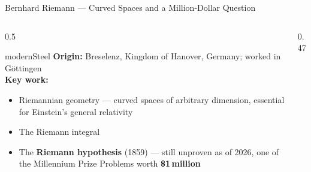 \begin{frame}[shrink=11]{Bernhard Riemann --- Curved Spaces and a Million-Dollar Question}

  \begin{columns}[T]
    \begin{column}{0.5\textwidth}
      \begin{personbox}{modernSteel}
        \textbf{Origin:} Breselenz, Kingdom of Hanover, Germany;
        worked in G\"ottingen\\[3pt]
        \textbf{Key work:}
        \begin{itemize}\setlength\itemsep{2pt}
          \item \alert{Riemannian geometry} --- curved spaces of arbitrary
                dimension, essential for Einstein's general relativity
          \item The Riemann integral
          \item The \textbf{Riemann hypothesis} (1859) --- still unproven
                as of 2026, one of the Millennium Prize Problems
                worth \textbf{\$1\,million}
        \end{itemize}
      \end{personbox}
    \end{column}

    \begin{column}{0.47\textwidth}
    \end{column}
  \end{columns}

\end{frame}

